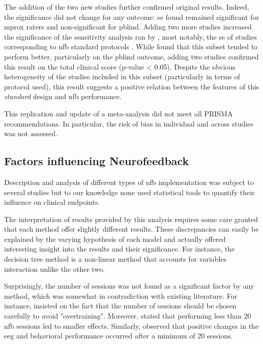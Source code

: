 The addition of the two new studies \citep{Strehl2017, Baumeister2016} further confirmed original results. Indeed, the
significance did not change for any outcome: \gls{se} found remained significant for \gls{mprox} raters and
non-significant for \gls{pblind}. Adding two more studies increased the significance of the sensitivity analysis ran by
\citeauthor{Cortese2016}, most notably, the \gls{se} of studies corresponding to \gls{nfb} standard protocols \citet{Arns2014}. 
While \citeauthor{Cortese2016} found that this subset tended to perform better, particularly on the \gls{pblind} outcome, 
adding two studies confirmed this result on the total clinical score (p-value < 0.05). Despite the obvious heterogeneity 
of the studies included in this subset (particularly in terms of protocol used), this result suggests a positive relation 
between the features of this \emph{standard} design and \gls{nfb} performance.

This replication and update of a meta-analysis did not meet all PRISMA recommendations. In particular, the risk of bias
in individual and across studies was not assessed.  

\subsection{Factors influencing Neurofeedback}

Description and analysis of different types of \gls{nfb} implementation was subject to several studies \citep{Arns2014, 
Enriquez2017, Vernon2004, Jeunet2018} but to our knowledge none used statistical tools to quantify their influence on
clinical endpoints. 

The interpretation of results provided by this analysis requires some care granted that each method offer slightly
different results. These discrepancies can easily be explained by the varying hypothesis of each model and actually
offered interesting insight into the results and their significance. For instance, the decision tree method is a
non-linear method that accounts for variables interaction unlike the other two. 

Surprisingly, the number of sessions was not found as a significant factor by any method, which was somewhat
in contradiction with existing literature. For instance, \citet{Enriquez2017} insisted on the fact that the number of
sessions should be chosen carefully to avoid "overtraining". Moreover, \citet{Arns2014} stated that performing less than
20 \gls{nfb} sessions led to smaller effects. Similarly, \citet{Vernon2004} observed that positive changes in the \gls{eeg}
and behavioral performance occurred after a minimum of 20 sessions. 

